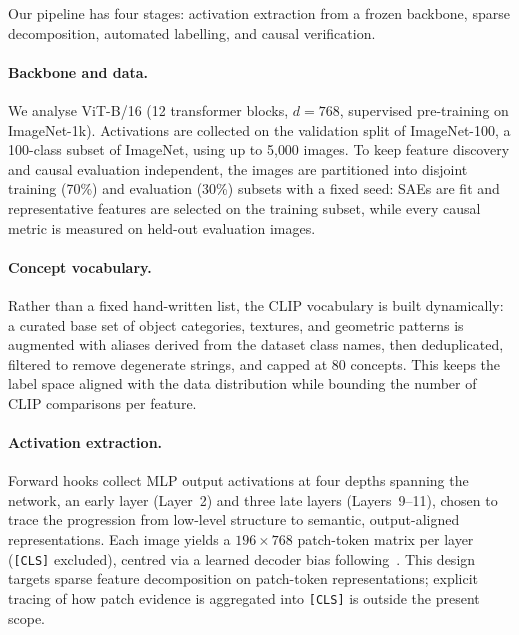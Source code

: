 Our pipeline has four stages: activation extraction from a frozen backbone, sparse decomposition, automated labelling, and causal verification.

\paragraph{Backbone and data.}
We analyse ViT-B/16 \cite{Dosovitskiy2021} (12 transformer blocks, $d{=}768$, supervised pre-training on ImageNet-1k). Activations are collected on the validation split of ImageNet-100, a 100-class subset of ImageNet, using up to 5{,}000 images. To keep feature discovery and causal evaluation independent, the images are partitioned into disjoint training (70\%) and evaluation (30\%) subsets with a fixed seed: SAEs are fit and representative features are selected on the training subset, while every causal metric is measured on held-out evaluation images.

\paragraph{Concept vocabulary.}
Rather than a fixed hand-written list, the CLIP vocabulary is built dynamically: a curated base set of object categories, textures, and geometric patterns is augmented with aliases derived from the dataset class names, then deduplicated, filtered to remove degenerate strings, and capped at 80 concepts. This keeps the label space aligned with the data distribution while bounding the number of CLIP comparisons per feature.

\paragraph{Activation extraction.}
Forward hooks collect MLP output activations at four depths spanning the network, an early layer (Layer~2) and three late layers (Layers~9--11), chosen to trace the progression from low-level structure to semantic, output-aligned representations. Each image yields a $196{\times}768$ patch-token matrix per layer (\texttt{[CLS]} excluded), centred via a learned decoder bias following~\cite{Bricken2023}.
This design targets sparse feature decomposition on patch-token representations; explicit tracing of how patch evidence is aggregated into \texttt{[CLS]} is outside the present scope.

